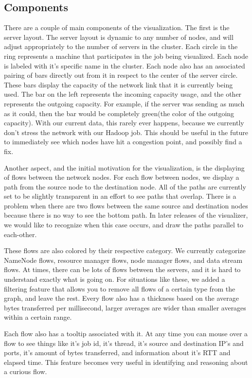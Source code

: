 \subsection{Components}
\label{ssec:comp}
There are a couple of main components of the visualization. The first
is the server layout. The server layout is dynamic to any number of
nodes, and will adjust appropriately to the number of servers in the
cluster. Each circle in the ring represents a machine that
participates in the job being visualized. Each node is labeled with
it's specific name in the cluster. Each node also has an associated
pairing of bars directly out from it in respect to the center of the
server circle. These bars display the capacity of the network
link that it is currently being used. The bar on the left represents
the incoming capacity usage, and the other represents the outgoing
capacity. For example, if the server was sending as much as it could,
then the bar would be completely green(the color of the outgoing
capacity). With our current data, this rarely ever happens, because we
currently don't stress the network with our Hadoop job. This should be
useful in the future to immediately see which nodes have hit a
congestion point, and possibly find a fix.

Another aspect, and the initial motivation for the visualization, is the
displaying of flows between the network nodes. For each flow between
nodes, we display a path from the source node to the destination node.
All of the paths are currently set to be slightly transparent in an
effort to see paths that overlap. There is a problem when there are
two flows between the same source and destination nodes because there
is no way to see the bottom path. In later releases of the visualizer,
we would like to recognize when this case occurs, and draw the paths
parallel to each-other.

These flows are also colored by their respective category. We
currently categorize NameNode flows, resource manager flows, node
manager flows, and data stream flows. At times, there can be lots
of flows between the servers, and it is hard to understand exactly
what is going on. For situations like these, we added a filtering
feature that allows you to remove all flows of a certain type from the
graph, and leave the rest. Every flow also has a thickness based on
the average bytes transferred per millisecond, larger averages are wider
than smaller averages within a certain range.

Each flow also has a tooltip associated with it. At any time you can
mouse over a flow to see things like it's job id, it's thread, it's
source and destination IP's and ports, it's amount of bytes
transferred, and information about it's RTT and elapsed time. This
feature becomes very useful in identifying and reasoning about a
curious flow.

